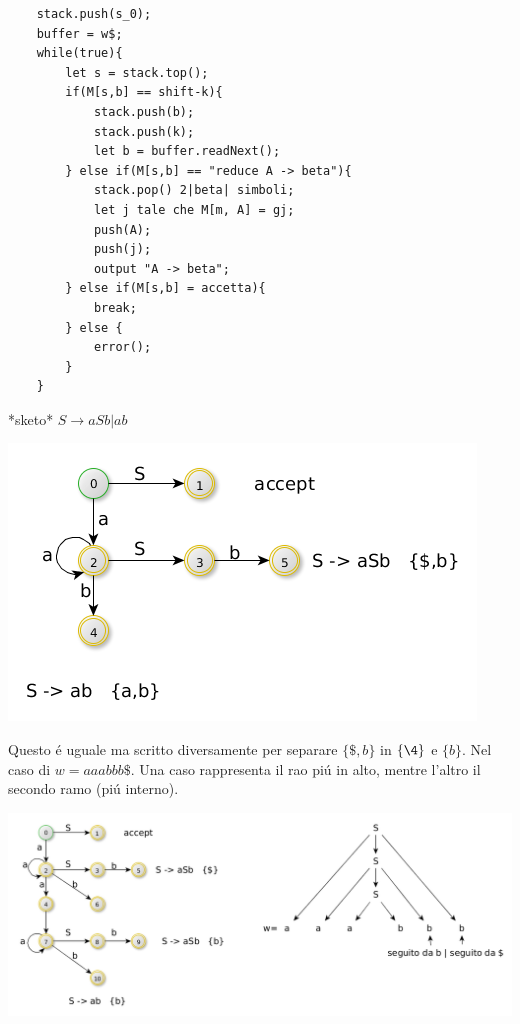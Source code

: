 \begin{lstlisting}
    stack.push(s_0);
    buffer = w$;
    while(true){
        let s = stack.top();
        if(M[s,b] == shift-k){
            stack.push(b);
            stack.push(k);
            let b = buffer.readNext(); 
        } else if(M[s,b] == "reduce A -> beta"){
            stack.pop() 2|beta| simboli;
            let j tale che M[m, A] = gj;
            push(A);
            push(j);
            output "A -> beta";
        } else if(M[s,b] = accetta){
            break;
        } else {
            error();
        }
    }
\end{lstlisting}

*sketo*
$S \rightarrow aSb | ab $

\begin{center}
    \includegraphics[scale=0.4]{Chapters/Img/c02_15.png}\\
\end{center} 

Questo \'e uguale ma scritto diversamente per separare $\{ \$, b\}$ in $\{\4\}$ e $\{b\}$. Nel caso di $w=aaabbb\$$. Una caso rappresenta
il rao pi\'u in alto, mentre l'altro il secondo ramo (pi\'u interno).

\begin{center}
    \includegraphics[scale=0.4]{Chapters/Img/c02_16.png}\\
\end{center} 


